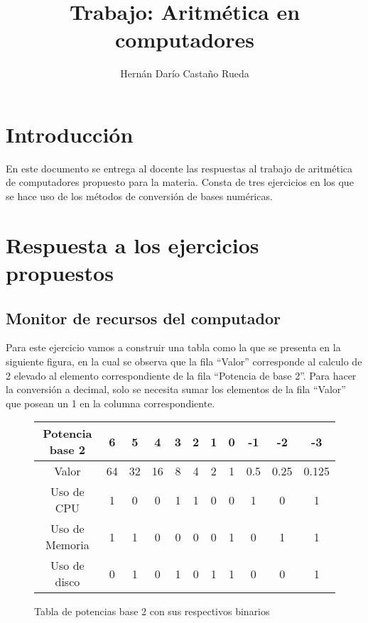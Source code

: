 \documentclass[stu, 12pt, letterpaper, donotrepeattitle, floatsintext, natbib]{apa7}
\title{\Large Trabajo: Aritmética en computadores}
\author{Hernán Darío Castaño Rueda} %
\affiliation{Fundación Universitaria Internacional de la Rioja}
\begin{document}
\maketitle


\renewcommand\contentsname{\largeÍndice}
\tableofcontents
\setcounter{tocdepth}{2}
\newpage


\section{\large Introducción}
En este documento se entrega al docente las respuestas al trabajo de aritmética de computadores propuesto para la materia. Consta de tres ejercicios en los que se hace uso de los métodos de conversión de bases numéricas.

\section{\large Respuesta a los ejercicios propuestos}
\subsection{Monitor de recursos del computador}

Para este ejercicio vamos a construir una tabla como la que se presenta en la siguiente figura, en la cual se observa que la fila “Valor” corresponde al calculo de 2 elevado al elemento correspondiente de la fila “Potencia de base 2”. Para hacer la conversión a decimal, solo se necesita sumar los elementos de la fila “Valor” que posean un 1 en la columna correspondiente.

\begin{figure}
\centering
\begin{tabular}{|c|c|c|c|c|c|c|c|c|c|c|}
\hline 
Potencia base 2 & 6 & 5 & 4 & 3 & 2 & 1 & 0 & -1 & -2 & -3 \\ 
\hline 
Valor & 64 & 32 & 16 & 8 & 4 & 2 & 1 & 0.5 & 0.25 & 0.125 \\ 
\hline 
Uso de CPU & 1 & 0 & 0 & 1 & 1 & 0 & 0 & 1 & 0 & 1 \\ 
\hline 
Uso de Memoria & 1 & 1 & 0 & 0 & 0 & 0 & 1 & 0 & 1 & 1 \\ 
\hline 
Uso de disco & 0 & 1 & 0 & 1 & 0 & 1 & 1 & 0 & 0 & 1 \\ 
\hline 
\end{tabular}
\vspace{0.5cm} 
\caption{Tabla de potencias base 2 con sus respectivos binarios}
\end{figure}
\end{document}

